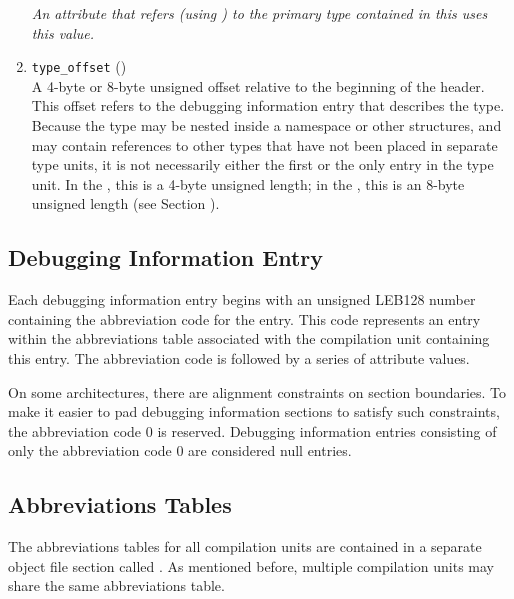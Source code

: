 \begin{enumerate}[1. ]
\textit{An attribute that refers (using 
\DWFORMrefsigeight{}) to
the primary type contained in this 
 uses this value.}

\item \texttt{type\_offset} () \\
A 4-byte or 8-byte unsigned offset 
relative to the beginning
of the  header.
This offset refers to the debugging
information entry that describes the type. Because the type
may be nested inside a namespace or other structures, and may
contain references to other types that have not been placed in
separate type units, it is not necessarily either the first or
the only entry in the type unit. In the \thirtytwobitdwarfformat,
this is a 4-byte unsigned length; in the \sixtyfourbitdwarfformat,
this is an 8-byte unsigned length
(see Section ).

\end{enumerate}

\subsection{Debugging Information Entry}
\label{datarep:debugginginformationentry}

Each debugging information entry begins with an 
unsigned LEB128
number containing the abbreviation code for the entry. This
code represents an entry within the abbreviations table
associated with the compilation unit containing this entry. The
abbreviation code is followed by a series of attribute values.

On some architectures, there are alignment constraints on
section boundaries. To make it easier to pad debugging
information sections to satisfy such constraints, the
abbreviation code 0 is reserved. Debugging information entries
consisting of only the abbreviation code 0 are considered
null entries.

\subsection{Abbreviations Tables}
\label{datarep:abbreviationstables}
The abbreviations tables for all compilation units
are contained in a separate object file section called
\dotdebugabbrev{}.
As mentioned before, multiple compilation
units may share the same abbreviations table.


